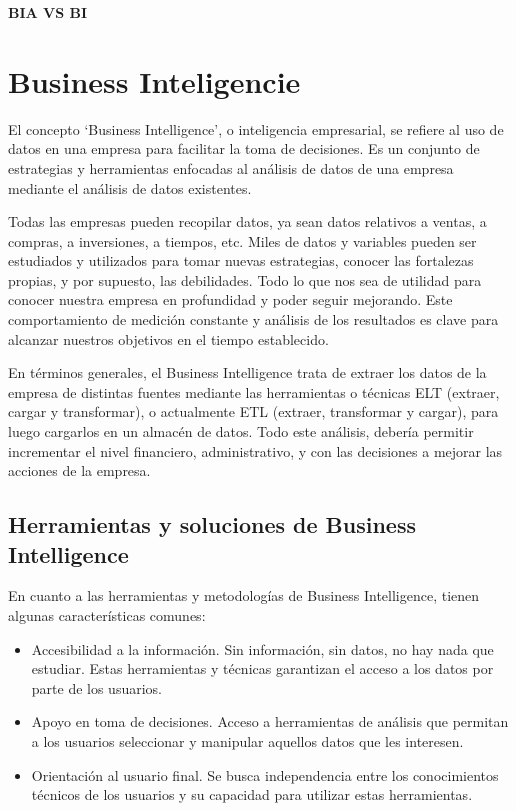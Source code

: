 \documentclass[12pt,a4paper]{report}
\begin{document}


\tableofcontents
\newpage

\begin{Large}
\textbf{BIA VS BI} 
\end{Large}
\section{Business Inteligencie}
El concepto ‘Business Intelligence’, o inteligencia empresarial, se refiere al uso de datos en una empresa para facilitar la toma de decisiones. Es un conjunto de estrategias y herramientas enfocadas al análisis de datos de una empresa mediante el análisis de datos existentes.

Todas las empresas pueden recopilar datos, ya sean datos relativos a ventas, a compras, a inversiones, a tiempos, etc. Miles de datos y variables pueden ser estudiados y utilizados para tomar nuevas estrategias, conocer las fortalezas propias, y por supuesto, las debilidades. Todo lo que nos sea de utilidad para conocer nuestra empresa en profundidad y poder seguir mejorando. Este comportamiento de medición constante y análisis de los resultados es clave para alcanzar nuestros objetivos en el tiempo establecido. 

En términos generales, el Business Intelligence trata de extraer los datos de la empresa de distintas fuentes mediante las herramientas o técnicas ELT (extraer, cargar y transformar), o actualmente ETL (extraer, transformar y cargar), para luego cargarlos en un almacén de datos. Todo este análisis, debería permitir incrementar el nivel financiero, administrativo, y con las decisiones a mejorar las acciones de la empresa.

\subsection{Herramientas y soluciones de Business Intelligence}
En cuanto a las herramientas y metodologías de Business Intelligence, tienen algunas características comunes:
\begin{itemize}
\item Accesibilidad a la información. Sin información, sin datos, no hay nada que estudiar. Estas herramientas y técnicas garantizan el acceso a los datos por parte de los usuarios.
\item Apoyo en toma de decisiones. Acceso a herramientas de análisis que permitan a los usuarios seleccionar y manipular aquellos datos que les interesen.
\item Orientación al usuario final. Se busca independencia entre los conocimientos técnicos de los usuarios y su capacidad para utilizar estas herramientas.
\end{itemize}
\end{document}
